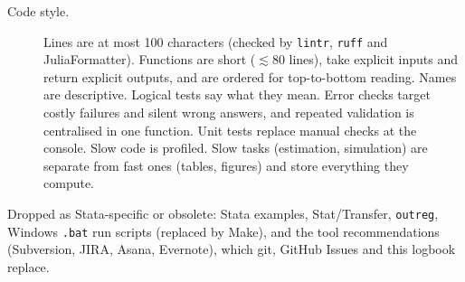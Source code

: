 \begin{description}
	\item[Code style.]
	Lines are at most 100 characters (checked by \texttt{lintr}, \texttt{ruff} and JuliaFormatter).
	Functions are short ($\lesssim 80$ lines), take explicit inputs and return explicit outputs, and are ordered for top-to-bottom reading.
	Names are descriptive.
	Logical tests say what they mean.
	Error checks target costly failures and silent wrong answers, and repeated validation is centralised in one function.
	Unit tests replace manual checks at the console.
	Slow code is profiled.
	Slow tasks (estimation, simulation) are separate from fast ones (tables, figures) and store everything they compute.
\end{description}

Dropped as Stata-specific or obsolete: Stata examples, Stat/Transfer, \texttt{outreg}, Windows \texttt{.bat} run scripts (replaced by Make), and the tool recommendations (Subversion, JIRA, Asana, Evernote), which git, GitHub Issues and this logbook replace.
